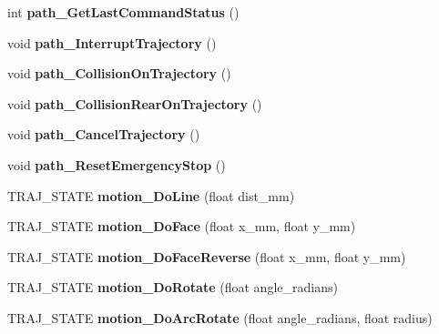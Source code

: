 \begin{DoxyCompactItemize}
\item 
\mbox{\label{classAsservN_a5dae80a7ffeae26c75751f9d7b362ee0}} 
int {\bfseries path\+\_\+\+Get\+Last\+Command\+Status} ()
\item 
\mbox{\label{classAsservN_a5d9332e9a4a1e13dd5fe7db3efce1871}} 
void {\bfseries path\+\_\+\+Interrupt\+Trajectory} ()
\item 
\mbox{\label{classAsservN_ae792ee21d684342dc24fa250626b6d4e}} 
void {\bfseries path\+\_\+\+Collision\+On\+Trajectory} ()
\item 
\mbox{\label{classAsservN_ad8864802fc5af8bdcc3adb36d41765b8}} 
void {\bfseries path\+\_\+\+Collision\+Rear\+On\+Trajectory} ()
\item 
\mbox{\label{classAsservN_a9183fcf2290bd2edcf13b741019dafa3}} 
void {\bfseries path\+\_\+\+Cancel\+Trajectory} ()
\item 
\mbox{\label{classAsservN_abbb9dda662c12fd5dca2fa89b670badd}} 
void {\bfseries path\+\_\+\+Reset\+Emergency\+Stop} ()
\item 
\mbox{\label{classAsservN_aa3f100a30f787da350a4a9e1cd35a9ea}} 
T\+R\+A\+J\+\_\+\+S\+T\+A\+TE {\bfseries motion\+\_\+\+Do\+Line} (float dist\+\_\+mm)
\item 
\mbox{\label{classAsservN_a64c4b711769055b61f75b47636d894bb}} 
T\+R\+A\+J\+\_\+\+S\+T\+A\+TE {\bfseries motion\+\_\+\+Do\+Face} (float x\+\_\+mm, float y\+\_\+mm)
\item 
\mbox{\label{classAsservN_ab1598b909531730c1c1ca5b4df5ada50}} 
T\+R\+A\+J\+\_\+\+S\+T\+A\+TE {\bfseries motion\+\_\+\+Do\+Face\+Reverse} (float x\+\_\+mm, float y\+\_\+mm)
\item 
\mbox{\label{classAsservN_ae2858d510206135f10dcf02cb44de1cd}} 
T\+R\+A\+J\+\_\+\+S\+T\+A\+TE {\bfseries motion\+\_\+\+Do\+Rotate} (float angle\+\_\+radians)
\item 
\mbox{\label{classAsservN_a5f56b0af802203f4f4f6d3ec160b1b44}} 
T\+R\+A\+J\+\_\+\+S\+T\+A\+TE {\bfseries motion\+\_\+\+Do\+Arc\+Rotate} (float angle\+\_\+radians, float radius)

\end{DoxyCompactItemize}
